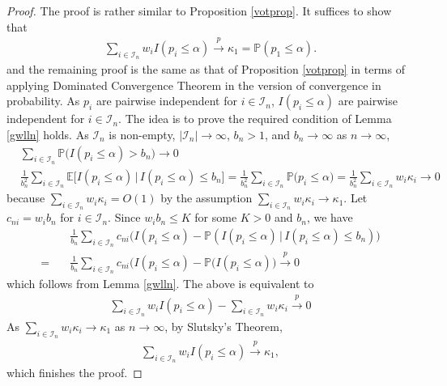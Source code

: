 \documentclass[11pt]{article}
\def\mc#1{\mathcal{#1}} %
\def\E{\mathbb{E}} %
\def\mc#1{\mathcal{#1}}
\def\P{\mathbb{P}}
\def\cp{\overset{p}{\to}}
\theoremstyle{definition}
\begin{document}
\begin{proof}
  The proof is rather similar to Proposition \ref{votprop}. It suffices to show that
  \begin{align*}
   \sum_{i\in \mc{I}_n} w_i I(p_i \leq  \alpha) \cp \kappa_1 =  \P(p_1 \leq \alpha).
  \end{align*}
  and the remaining proof is the same as that of Proposition \ref{votprop} in terms of applying Dominated Convergence Theorem in the version of  convergence in probability. As $p_i$ are pairwise independent for $i\in \mc{I}_n$, $I(p_i\leq \alpha)$ are pairwise independent for $i \in \mc{I}_n$. The idea is to prove the required condition of Lemma \ref{gwlln} holds. As  $\mc{I}_n$  is non-empty, $|\mc{I}_n| \to \infty$, $b_n > 1$, and  $b_n \to \infty$ as $n \to \infty$, 
  \begin{align*}
    & \sum_{i\in \mc{I}_n} \P\big( I(p_i \leq  \alpha) > b_n\big) \to 0\\
   & \frac{1}{b_n^2} \sum_{i\in \mc{I}_n} \E\big[ I(p_i \leq  \alpha) \,|\, I(p_i \leq  \alpha) \leq b_n\big]
     =  \frac{1}{b_n^2} \sum_{i\in \mc{I}_n} \P\big(p_i \leq\alpha \big)
     = \frac{1}{b_n^2} \sum_{i\in \mc{I}_n} w_i \kappa_i  \to 0
  \end{align*}
  because $ \sum_{i\in \mc{I}_n} w_i \kappa_i = O(1)$ by the assumption $\sum_{i\in \mc{I}_n} w_i \kappa_i \to \kappa_{1}$. Let $c_{ni} = w_i b_n$ for $i \in \mc{I}_n$. Since $w_i b_n\leq K$ for some $K > 0$ and $b_n$, we have 
  \begin{align*}
    & \frac{1}{b_n} \sum_{i\in \mc{I}_n}  c_{ni} \big(  I(p_i \leq  \alpha) - \P( I(p_i \leq  \alpha) \, |\,  I(p_i \leq  \alpha)  \leq b_n )  \big) \\
  = \quad     &\frac{1}{b_n} \sum_{i\in \mc{I}_n}  c_{ni} \big(  I(p_i \leq  \alpha) - \P( I(p_i \leq  \alpha) \big)  \cp 0
  \end{align*}
  which follows from Lemma \ref{gwlln}. The above is equivalent to
  \begin{align*}
   \sum_{i\in \mc{I}_n}  w_i I(p_i \leq  \alpha) - \sum_{i\in \mc{I}_n} w_i  \kappa_i  \cp 0
  \end{align*}
  As $\sum_{i\in \mc{I}_n} w_i  \kappa_i\to \kappa_1$ as $n \to \infty$, by Slutsky's Theorem,
  \begin{align*}
     \sum_{i\in \mc{I}_n}  w_i I(p_i \leq  \alpha)  \cp \kappa_1,
  \end{align*}
  which finishes the proof.
\end{proof}
\end{document}
